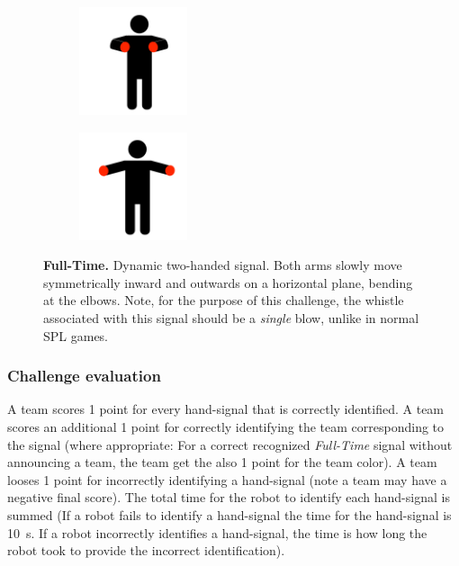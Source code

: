         \begin{figure}[ht!]
            \centering
            \begin{subfigure}{.33\textwidth}
                \centering
                \includegraphics[height=120px]{figs/referee-signals/full-time-start.png}
            \end{subfigure}
            \begin{subfigure}{.33\textwidth}
                \centering
                \includegraphics[height=120px]{figs/referee-signals/full-time-end.png}
            \end{subfigure}
            \caption{\textbf{Full-Time.}
            Dynamic two-handed signal. Both arms slowly move symmetrically inward and outwards on a horizontal plane, bending at the elbows. Note, for the purpose of this challenge, the whistle associated with this signal should be a \textit{single} blow, unlike in normal SPL games.}
        \end{figure}
        
        \clearpage
    \subsubsection{Challenge evaluation}
        A team scores 1 point for every hand-signal that is correctly identified. A team scores an additional 1 point for correctly identifying the team corresponding to the signal (where appropriate: For a correct recognized \textit{Full-Time} signal without announcing a team, the team get the also 1 point for the team color). A team looses 1 point for incorrectly identifying a hand-signal (note a team may have a negative final score). The total time for the robot to identify each hand-signal is summed (If a robot fails to identify a hand-signal the time for the hand-signal is \qty{10}{\second}. If a robot incorrectly identifies a hand-signal, the time is how long the robot took to provide the incorrect identification).
    
